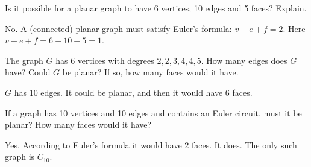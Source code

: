 \begin{questions}

	
\question Is it possible for a planar graph to have 6 vertices, 10 edges and 5 faces?  Explain.

	\begin{answer}
		No.  A (connected) planar graph must satisfy Euler's formula: $v - e + f = 2$.  Here $v - e + f = 6 - 10 + 5 = 1$. %
	\end{answer}
	
	



\question The graph $G$ has 6 vertices with degrees $2, 2, 3, 4, 4, 5$.  How many edges does $G$ have?  Could $G$ be planar?  If so, how many faces would it have.

	\begin{answer}
		$G$ has 10 edges.  It could be planar, and then it would have 6 faces. %
	\end{answer}
	




\question If a graph has 10 vertices and 10 edges and contains an Euler circuit, must it be planar?  How many faces would it have?

	\begin{answer}
		Yes.  According to Euler's formula it would have 2 faces.  It does.  The only such graph is $C_{10}$. %
	\end{answer}
	
	

\end{questions}